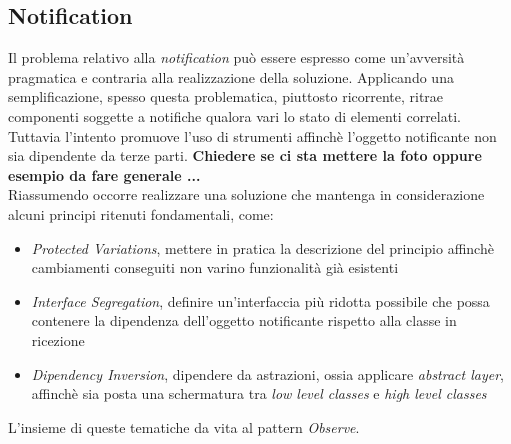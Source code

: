 \documentclass{article}
\begin{document}
\subsection*{Notification}
\large
Il problema relativo alla \textit{notification} può essere espresso come un'avversità pragmatica e contraria alla realizzazione della soluzione. Applicando una semplificazione, spesso questa problematica, piuttosto ricorrente, ritrae componenti soggette a notifiche qualora vari lo stato di elementi correlati. Tuttavia l'intento promuove l'uso di strumenti affinchè l'oggetto notificante non sia dipendente da terze parti. \textbf{Chiedere se ci sta mettere la foto oppure esempio da fare generale ...}\vspace*{14pt}\\
Riassumendo occorre realizzare una soluzione che mantenga in considerazione alcuni principi ritenuti fondamentali, come:
\begin{itemize}[label={-}]
    \itemsep0em
    \item \textit{Protected Variations}, mettere in pratica la descrizione del principio affinchè cambiamenti conseguiti non varino funzionalità già esistenti
    \item \textit{Interface Segregation}, definire un'interfaccia più ridotta possibile che possa contenere la dipendenza dell'oggetto notificante rispetto alla classe in ricezione
    \item \textit{Dipendency Inversion}, dipendere da astrazioni, ossia applicare \textit{abstract layer}, affinchè sia posta una schermatura tra \textit{low level classes} e \textit{high level classes}
\end{itemize}
L'insieme di queste tematiche da vita al pattern \textit{Observe}.
\end{document}
